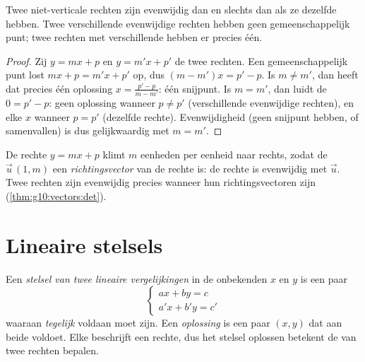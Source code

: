 \begin{proposition}\label{prop:g10:lines:parallel}
Twee niet-verticale rechten zijn evenwijdig dan en slechts dan als ze
dezelfde  hebben. Twee verschillende evenwijdige rechten
hebben geen gemeenschappelijk punt; twee rechten met verschillende
 hebben er precies één.
\end{proposition}

\begin{proof}
Zij $y = mx + p$ en $y = m'x + p'$ de twee rechten. Een gemeenschappelijk
punt lost $mx + p = m'x + p'$ op, dus $(m - m')x = p' - p$. Is $m \neq m'$,
dan heeft dat precies één oplossing $x = \frac{p' - p}{m - m'}$: één
snijpunt. Is $m = m'$, dan luidt de  $0 = p' - p$: geen oplossing
wanneer $p \neq p'$ (verschillende evenwijdige rechten), en elke $x$ wanneer
$p = p'$ (dezelfde rechte). Evenwijdigheid (geen snijpunt hebben, of
samenvallen) is dus gelijkwaardig met $m = m'$.
\end{proof}

\begin{remark}[Richtingsvector]
De rechte $y = mx + p$ klimt $m$ eenheden per eenheid naar rechts, zodat de
 $\vec u\,(1, m)$ een \emph{richtingsvector} van
de rechte is: de rechte is evenwijdig met $\vec u$. Twee rechten zijn
evenwijdig precies wanneer hun richtingsvectoren  zijn
(\cref{thm:g10:vectors:det}).
\end{remark}

\section{Lineaire stelsels}

\begin{definition}\label{def:g10:lines:system}
Een \emph{stelsel van twee lineaire vergelijkingen} in
de onbekenden $x$ en $y$ is een paar 
\[
\begin{cases}
a x + b y = c \\
a' x + b' y = c'
\end{cases}
\]
waaraan \emph{tegelijk} voldaan moet zijn. Een \emph{oplossing} is een paar
$(x, y)$ dat aan beide voldoet. Elke  beschrijft een rechte, dus
het stelsel oplossen betekent de  van twee rechten bepalen.
\end{definition}

